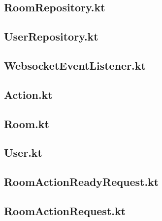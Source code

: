 \documentclass{../includes/TechDoc}
\begin{document}
    \subsection{RoomRepository.kt}
    

    \subsection{UserRepository.kt}
    

    \subsection{WebsocketEventListener.kt}
    

    \subsection{Action.kt}
    

    \subsection{Room.kt}
    

    \subsection{User.kt}
    

    \subsection{RoomActionReadyRequest.kt}
    

    \subsection{RoomActionRequest.kt}
    
\end{document}
